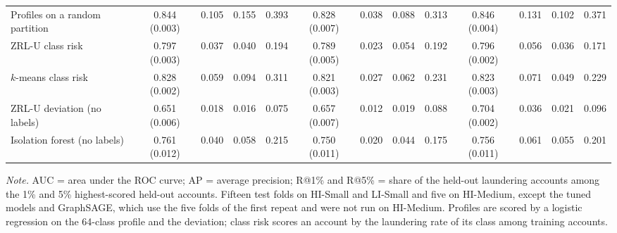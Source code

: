 \begin{table}[t]
{\begin{tabular}{@{}lcccccccccccc@{}}
Profiles on a random partition & 0.844 (0.003) & 0.105 & 0.155 & 0.393 & 0.828 (0.007) & 0.038 & 0.088 & 0.313 & 0.846 (0.004) & 0.131 & 0.102 & 0.371 \\
\addlinespace
ZRL-U class risk & 0.797 (0.003) & 0.037 & 0.040 & 0.194 & 0.789 (0.005) & 0.023 & 0.054 & 0.192 & 0.796 (0.002) & 0.056 & 0.036 & 0.171 \\
$k$-means class risk & 0.828 (0.002) & 0.059 & 0.094 & 0.311 & 0.821 (0.003) & 0.027 & 0.062 & 0.231 & 0.823 (0.003) & 0.071 & 0.049 & 0.229 \\
\addlinespace
ZRL-U deviation (no labels) & 0.651 (0.006) & 0.018 & 0.016 & 0.075 & 0.657 (0.007) & 0.012 & 0.019 & 0.088 & 0.704 (0.002) & 0.036 & 0.021 & 0.096 \\
Isolation forest (no labels) & 0.761 (0.012) & 0.040 & 0.058 & 0.215 & 0.750 (0.011) & 0.020 & 0.044 & 0.175 & 0.756 (0.011) & 0.061 & 0.055 & 0.201 \\
\bottomrule
\end{tabular}}
\par\vspace{3pt}\parbox{0.98\textwidth}{\footnotesize \emph{Note.} AUC = area under the ROC curve; AP = average precision; R@1\% and R@5\% = share of the held-out laundering accounts among the 1\% and 5\% highest-scored held-out accounts. Fifteen test folds on HI-Small and LI-Small and five on HI-Medium, except the tuned models and GraphSAGE, which use the five folds of the first repeat and were not run on HI-Medium. Profiles are scored by a logistic regression on the 64-class profile and the deviation; class risk scores an account by the laundering rate of its class among training accounts.}
\end{table}

